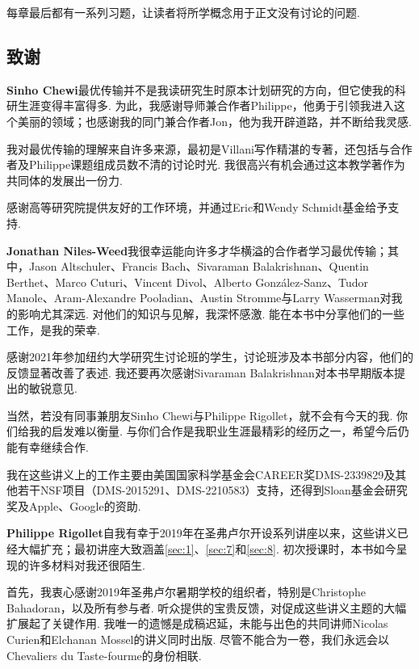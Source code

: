 每章最后都有一系列习题，让读者将所学概念用于正文没有讨论的问题.

\subsection*{致谢}\label{sec:acknowledgments}

\noindent\textbf{Sinho Chewi}\quad 最优传输并不是我读研究生时原本计划研究的方向，但它使我的科研生涯变得丰富得多. 为此，我感谢导师兼合作者Philippe，他勇于引领我进入这个美丽的领域；也感谢我的同门兼合作者Jon，他为我开辟道路，并不断给我灵感.

我对最优传输的理解来自许多来源，最初是Villani写作精湛的专著\cite{ref315}，还包括与合作者及Philippe课题组成员数不清的讨论时光. 我很高兴有机会通过这本教学著作为共同体的发展出一份力.

感谢高等研究院提供友好的工作环境，并通过Eric和Wendy Schmidt基金给予支持.

\noindent\textbf{Jonathan Niles-Weed}\quad 我很幸运能向许多才华横溢的合作者学习最优传输；其中，Jason Altschuler、Francis Bach、Sivaraman Balakrishnan、Quentin Berthet、Marco Cuturi、Vincent Divol、Alberto González-Sanz、Tudor Manole、Aram-Alexandre Pooladian、Austin Stromme与Larry Wasserman对我的影响尤其深远. 对他们的知识与见解，我深怀感激. 能在本书中分享他们的一些工作，是我的荣幸.

感谢2021年参加纽约大学研究生讨论班的学生，讨论班涉及本书部分内容，他们的反馈显著改善了表述. 我还要再次感谢Sivaraman Balakrishnan对本书早期版本提出的敏锐意见.

当然，若没有同事兼朋友Sinho Chewi与Philippe Rigollet，就不会有今天的我. 你们给我的启发难以衡量. 与你们合作是我职业生涯最精彩的经历之一，希望今后仍能有幸继续合作.

我在这些讲义上的工作主要由美国国家科学基金会CAREER奖DMS-2339829及其他若干NSF项目（DMS-2015291、DMS-2210583）支持，还得到Sloan基金会研究奖及Apple、Google的资助.

\noindent\textbf{Philippe Rigollet}\quad 自我有幸于2019年在圣弗卢尔开设系列讲座以来，这些讲义已经大幅扩充；最初讲座大致涵盖\autoref{sec:1}、\autoref{sec:7}和\autoref{sec:8}. 初次授课时，本书如今呈现的许多材料对我还很陌生.

首先，我衷心感谢2019年圣弗卢尔暑期学校的组织者，特别是Christophe Bahadoran，以及所有参与者. 听众提供的宝贵反馈，对促成这些讲义主题的大幅扩展起了关键作用. 我唯一的遗憾是成稿迟延，未能与出色的共同讲师Nicolas Curien和Elchanan Mossel的讲义同时出版. 尽管不能合为一卷，我们永远会以Chevaliers du Taste-fourme的身份相联.

